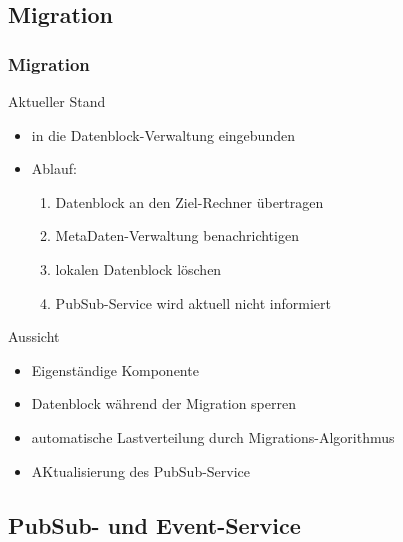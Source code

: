 \documentclass{beamer}
\begin{document}
	\subsection{Migration}

		\begin{frame}
			\frametitle{Migration}

			\begin{block}{Aktueller Stand}
				\begin{itemize}
					\item in die Datenblock-Verwaltung eingebunden
					\item Ablauf:
						\begin{enumerate}
							\item Datenblock an den Ziel-Rechner übertragen
							\item MetaDaten-Verwaltung benachrichtigen
							\item lokalen Datenblock löschen
							\item PubSub-Service wird aktuell nicht informiert
						\end{enumerate}
				\end{itemize}
			\end{block}

			\begin{block}{Aussicht}
				\begin{itemize}
					\item Eigenständige Komponente
					\item Datenblock während der Migration sperren
					\item automatische Lastverteilung durch Migrations-Algorithmus
					\item AKtualisierung des PubSub-Service
				\end{itemize}
			\end{block}
		\end{frame}

	\subsection{PubSub- und Event-Service}
\end{document}
